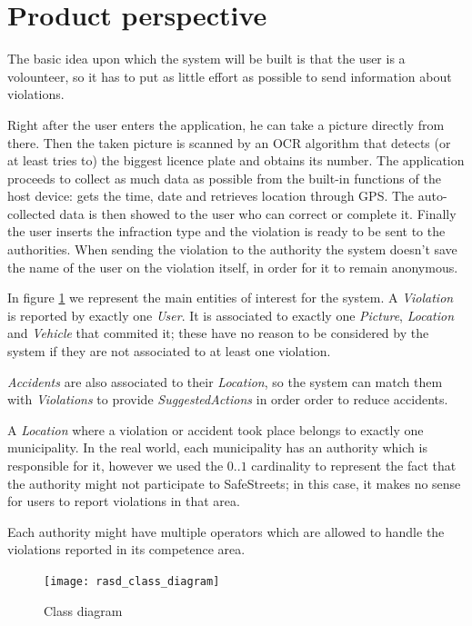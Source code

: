 \section{Product perspective}
The basic idea upon which the system will be built is that the user is a
volounteer, so it has to put as little effort as possible to send information
about violations.

Right after the user enters the application, he can take a picture directly from
there. Then the taken picture is scanned by an OCR algorithm that detects (or at
least tries to) the biggest licence plate and obtains its number. The
application proceeds to collect as much data as possible from the built-in
functions of the host device: gets the time, date and retrieves location through
GPS.
The auto-collected data is then showed to the user who can correct or
complete it. Finally the user inserts the infraction type and the violation is
ready to be sent to the authorities.
When sending the violation to the authority the system doesn't save the name
of the user on the violation itself, in order for it to remain anonymous.

In figure \ref{fig:classDiagram} we represent the main entities of interest
for the system.
A \emph{Violation} is reported by exactly one \emph{User}. It is associated to
exactly one \emph{Picture}, \emph{Location} and \emph{Vehicle} that commited it;
these have no reason to be considered by the system if they are not associated
to at least one violation.

\emph{Accidents} are also associated to their \emph{Location}, so the system can
match them with \emph{Violations} to provide \emph{SuggestedActions} in order
order to reduce accidents.

A \emph{Location} where a violation or accident took place belongs to exactly
one municipality. In the real world, each municipality has an authority which is
responsible for it, however we used the $0..1$ cardinality to represent the
fact that the authority might not participate to SafeStreets; in this case, it
makes no sense for users to report violations in that area.

Each authority might have multiple operators which are allowed to handle the
violations reported in its competence area.

\begin{figure}[H]
    \centering
    \texttt{[image: rasd\_class\_diagram]}
    \caption{Class diagram}
    \label{fig:classDiagram}
\end{figure}

